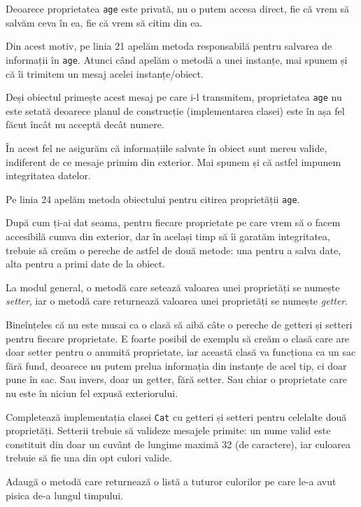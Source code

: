 Deoarece proprietatea \texttt{age} este privată, nu o putem accesa direct,
fie că vrem să salvăm ceva în ea, fie că vrem să citim din ea.

Din acest motiv, pe linia 21 apelăm metoda responsabilă pentru salvarea
de informații în \texttt{age}. Atunci când apelăm o metodă a unei instanțe,
mai spunem și că îi trimitem un mesaj acelei instanțe/obiect.

Deși obiectul primește acest mesaj pe care i-l transmitem, proprietatea
\texttt{age} nu este setată deoarece planul de construcție (implementarea clasei)
este în așa fel făcut încât nu acceptă decât numere.

În acest fel ne asigurăm că informațiile salvate în obiect sunt mereu valide,
indiferent de ce mesaje primim din exterior. Mai spunem și că astfel
impunem integritatea datelor.

Pe linia 24 apelăm metoda obiectului pentru citirea proprietății \texttt{age}.

După cum ți-ai dat seama, pentru fiecare proprietate pe care vrem să
o facem accesibilă cumva din exterior, dar în același timp să îi garatăm
integritatea, trebuie să creăm o pereche de astfel de două metode: una
pentru a salva date, alta pentru a primi date de la obiect.

La modul general, o metodă care setează valoarea unei proprietăți se numește
\textsl{setter}, iar o metodă care returnează valoarea unei proprietăți se
numește \textsl{getter}.

Bineînțeles că nu este musai ca o clasă să aibă câte o pereche
de getteri și setteri pentru fiecare proprietate.
E foarte posibil de exemplu să creăm o clasă care are doar setter pentru
o anumită proprietate, iar această clasă va funcționa ca un sac
fără fund, deoarece nu putem prelua informația din instanțe
de acel tip, ci doar {\glqq}pune în sac{\grqq}. Sau invers, doar
un getter, fără setter. Sau chiar o proprietate care nu este în
niciun fel expusă exteriorului.

\begin{Exercise}[title={A complete Kitty}]
\ExePart
Completează implementația clasei \texttt{Cat} cu getteri și setteri
pentru celelalte două proprietăți. Setterii trebuie să valideze
mesajele primite: un nume valid este constituit din doar un cuvânt
de lungime maximă 32 (de caractere), iar culoarea trebuie
să fie una din opt culori valide.

\ExePart
Adaugă o metodă care returnează o listă a tuturor culorilor pe
care le-a avut pisica de-a lungul timpului.
\end{Exercise}


